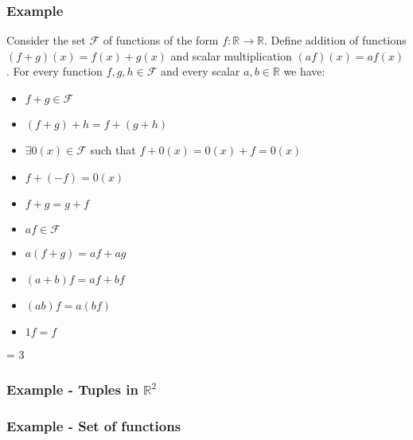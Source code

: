 \documentclass[usenames,dvipsnames,aspectratio=169,10pt]{beamer}
\def \EXAMPLEVERSION {1} %
\numberwithin{equation}{section}
\begin{document}
\begin{frame}
\frametitle{Example}

Consider the set $\mathcal{F}$ of functions of the form $f:\mathbb{R}\to\mathbb{R}$. Define addition of functions $(f+g)(x)=f(x)+g(x)$ and scalar multiplication $(af)(x)=af(x)$. For every function $f,g,h \in \mathcal{F}$ and every scalar $a,b\in\mathbb{R}$ we have:

\begin{minipage}{0.57\textwidth}
\begin{itemize}
\item $f+g \in \mathcal{F}$
\item $\left(f+g\right) +h = f+\left(g +h\right)$
\item $\exists 0(x)\in\mathcal{F}$ such that $f+0(x)=0(x)+f=0(x)$
\item $f+(-f)= 0(x)$
\item $f+g = g+f$
\end{itemize}
\end{minipage}\hfill
\begin{minipage}{0.43\textwidth}
\begin{itemize}
\item $af \in \mathcal{F}$
\item $a\left(f+g\right) = af+ag$
\item $\left(a+b\right)f = af+bf$
\item $\left(ab\right)f = a\left(bf\right)$
\item $1f=f$
\end{itemize}
\end{minipage}

\end{frame}
\fi


\ifnum \EXAMPLEVERSION = 3
\begin{frame}
\frametitle{Example - Tuples in $\mathbb{R}^2$}
\end{frame}

\begin{frame}
\frametitle{Example - Set of functions}
\end{frame}
\fi
\end{document}
